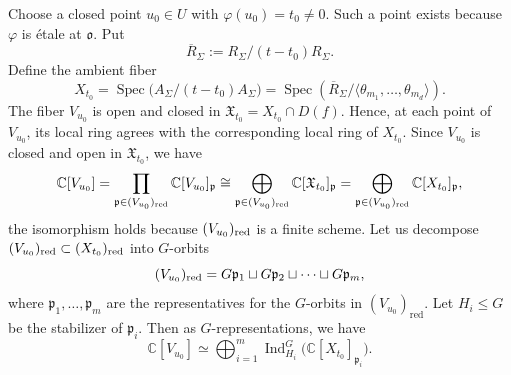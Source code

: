 \documentclass[12pt]{amsart}
\theoremstyle{remark}
\begin{document}
Choose a closed point $u_0\in U$ with $\varphi(u_0)=t_0\neq 0$. 
Such a point exists because $\varphi$ is \'etale at $\mathfrak{o}$. 
Put 
$$\overline{R}_{\Sigma} := R_\Sigma/(t-t_0)R_\Sigma.$$
Define the ambient fiber
$$X_{t_0}=\operatorname{Spec}\bigl(A_\Sigma/(t-t_0)A_\Sigma\bigr)
=\operatorname{Spec}(
\overline{R}_\Sigma/\langle\theta_{m_1},\ldots,\theta_{m_d}\rangle).
$$
The fiber $V_{u_0}$ is open and closed in $\mathfrak{X}_{t_0}=X_{t_0}\cap D(f)$. 
Hence, at each point of $V_{u_0}$, its local ring agrees with the
corresponding local ring of $X_{t_0}$.
Since $V_{u_0}$ is closed and open in $\mathfrak{X}_{t_0}$, we have 
$$
\mathbb{C}[V_{u_0}]=\prod_{\mathfrak{p}\in (V_{u_0})_{\rm red}}
\mathbb{C}[V_{u_0}]_{\mathfrak{p}}
\cong \bigoplus_{\mathfrak{p}\in (V_{u_0})_{\rm red}}
\mathbb{C}[\mathfrak{X}_{t_0}]_{\mathfrak{p}}
= \bigoplus_{\mathfrak{p}\in (V_{u_0})_{\rm red}}
\mathbb{C}[X_{t_0}]_{\mathfrak{p}},$$
the isomorphism holds because $(V_{u_0})_{\rm red}$ is a finite scheme.
Let us decompose $(V_{u_0})_{\rm red}
\subset (X_{t_0})_{\rm red}$ into $G$-orbits
$$(V_{u_0})_{\rm red}=G\mathfrak{p}_1\sqcup G\mathfrak{p}_2\sqcup \cdots\sqcup G\mathfrak{p}_m,$$
where $\mathfrak{p}_1,\ldots,\mathfrak p_m$ are the representatives for the
$G$-orbits in $(V_{u_0})_{\mathrm{red}}$.
Let $H_i\leq G$ be the stabilizer of $\mathfrak{p}_i$. 
Then as $G$-representations, we have
\begin{equation*}
\mathbb{C}[V_{u_0}]
\simeq \bigoplus_{i=1}^m
\operatorname{Ind}_{H_i}^G \big(\mathbb{C}[X_{t_0}]_{\mathfrak{p}_i}\big).
\end{equation*}
\end{document}
